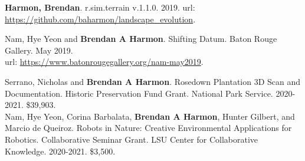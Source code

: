 \documentclass[10pt]{developercv} %
\begin{document}

\nocite{*}
\setlength\bibitemsep{0.75em}

\printbibliography[title={\cvsect{Books}},type=book, heading=subbibliography]

\printbibliography[title={\cvsect{Papers}},keyword=peer_reviewed, heading=subbibliography]

\printbibliography[title={\cvsect{Chapters}},type=incollection, heading=subbibliography]

\printbibliography[title={\cvsect{Select presentations}},type=unpublished, heading=subbibliography]

\printbibliography[title={\cvsect{Reports}},type=report, heading=subbibliography]



\textbf{Harmon, Brendan}. r.sim.terrain v.1.1.0. 2019. url: \url{https://github.com/baharmon/landscape_evolution}.



Nam, Hye Yeon and \textbf{Brendan A Harmon}. Shifting Datum. Baton Rouge Gallery. May 2019.\\
url: \url{https://www.batonrougegallery.org/nam-may2019}.

\clearpage



Serrano, Nicholas and \textbf{Brendan A Harmon}. 
Rosedown Plantation 3D Scan and Documentation. 
Historic Preservation Fund Grant. National Park Service. 
2020-2021. \$39,903.\\

Nam, Hye Yeon, Corina Barbalata, \textbf{Brendan A Harmon}, Hunter Gilbert, and Marcio de Queiroz.
Robots in Nature: Creative Environmental Applications for Robotics.
Collaborative Seminar Grant. LSU Center for Collaborative Knowledge.
2020-2021. \$3,500.\\
\end{document}
